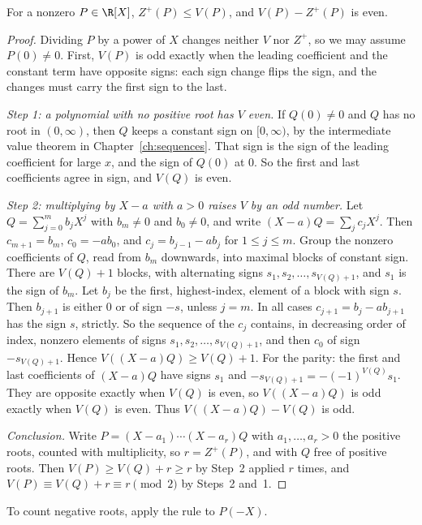 \begin{theorem}\label{thm:descartes}
For a nonzero $P\in\R[X]$, $Z^+(P)\le V(P)$, and $V(P)-Z^+(P)$ is even.
\end{theorem}
\begin{proof}
Dividing $P$ by a power of $X$ changes neither $V$ nor $Z^+$, so we may assume $P(0)\ne0$. First, $V(P)$ is odd exactly when the leading coefficient and the constant term have opposite signs: each sign change flips the sign, and the changes must carry the first sign to the last.

\emph{Step 1: a polynomial with no positive root has $V$ even.} If $Q(0)\ne0$ and $Q$ has no root in $(0,\infty)$, then $Q$ keeps a constant sign on $[0,\infty)$, by the intermediate value theorem in Chapter~\ref{ch:sequences}. That sign is the sign of the leading coefficient for large $x$, and the sign of $Q(0)$ at $0$. So the first and last coefficients agree in sign, and $V(Q)$ is even.

\emph{Step 2: multiplying by $X-a$ with $a>0$ raises $V$ by an odd number.} Let $Q=\sum_{j=0}^mb_jX^j$ with $b_m\ne0$ and $b_0\ne0$, and write $(X-a)Q=\sum_jc_jX^j$. Then $c_{m+1}=b_m$, $c_0=-ab_0$, and $c_j=b_{j-1}-ab_j$ for $1\le j\le m$. Group the nonzero coefficients of $Q$, read from $b_m$ downwards, into maximal blocks of constant sign. There are $V(Q)+1$ blocks, with alternating signs $s_1,s_2,\dots,s_{V(Q)+1}$, and $s_1$ is the sign of $b_m$. Let $b_j$ be the first, highest-index, element of a block with sign $s$. Then $b_{j+1}$ is either $0$ or of sign $-s$, unless $j=m$. In all cases $c_{j+1}=b_j-ab_{j+1}$ has the sign $s$, strictly. So the sequence of the $c_j$ contains, in decreasing order of index, nonzero elements of signs $s_1,s_2,\dots,s_{V(Q)+1}$, and then $c_0$ of sign $-s_{V(Q)+1}$. Hence $V((X-a)Q)\ge V(Q)+1$. For the parity: the first and last coefficients of $(X-a)Q$ have signs $s_1$ and $-s_{V(Q)+1}=-(-1)^{V(Q)}s_1$. They are opposite exactly when $V(Q)$ is even, so $V((X-a)Q)$ is odd exactly when $V(Q)$ is even. Thus $V((X-a)Q)-V(Q)$ is odd.

\emph{Conclusion.} Write $P=(X-a_1)\cdots(X-a_r)Q$ with $a_1,\dots,a_r>0$ the positive roots, counted with multiplicity, so $r=Z^+(P)$, and with $Q$ free of positive roots. Then $V(P)\ge V(Q)+r\ge r$ by Step~2 applied $r$ times, and $V(P)\equiv V(Q)+r\equiv r\pmod2$ by Steps~2 and~1.
\end{proof}

To count negative roots, apply the rule to $P(-X)$.

